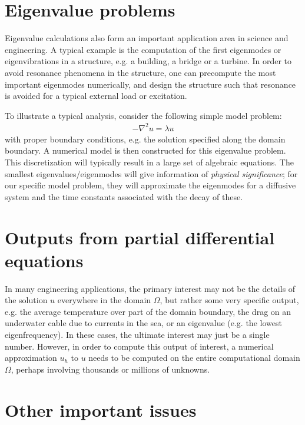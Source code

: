 \section{Eigenvalue problems}

Eigenvalue calculations also form an important application area in science and
engineering. A typical example is the computation of the first eigenmodes or
eigenvibrations in a structure, e.g. a building, a bridge or a turbine. In
order to avoid resonance phenomena in the structure, one can precompute the most
important eigenmodes numerically, and design the structure such that resonance
is avoided for a typical external load or excitation.

To illustrate a typical analysis, consider the following simple model problem:
\begin{align*}
  -\nabla^2 u = \lambda u
\end{align*}
with proper boundary conditions, e.g. the solution specified along the domain
boundary. A numerical model is then constructed for this eigenvalue problem.
This discretization will typically result in a large set of algebraic equations.
The smallest eigenvalues/eigenmodes will give information of \emph{physical
significance}; for our specific model problem, they will approximate the
eigenmodes for a diffusive system and the time constants associated with the
decay of these.

\section{Outputs from partial differential equations}

In many engineering applications, the primary interest may not be the details of
the solution $u$ everywhere in the domain $\Omega$, but rather some very
specific output, e.g. the average temperature over part of the domain boundary,
the drag on an underwater cable due to currents in the sea, or an eigenvalue
(e.g. the lowest eigenfrequency). In these cases, the ultimate interest may
just be a single number. However, in order to compute this output of interest, a
numerical approximation $u_h$ to $u$ needs to be computed on the entire
computational domain $\Omega$, perhaps involving thousands or millions of
unknowns.

\section{Other important issues}

